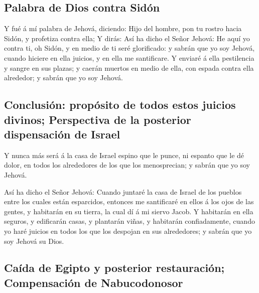 \hypertarget{palabra-de-dios-contra-siduxf3n}{%
\subsection{Palabra de Dios contra
Sidón}\label{palabra-de-dios-contra-siduxf3n}}

 Y fué á mí palabra de Jehová, diciendo: 
Hijo del hombre, pon tu rostro hacia Sidón, y profetiza contra ella;
 Y dirás: Así ha dicho el Señor Jehová: He aquí yo contra
ti, oh Sidón, y en medio de ti seré glorificado: y sabrán que yo soy
Jehová, cuando hiciere en ella juicios, y en ella me santificare.
 Y enviaré á ella pestilencia y sangre en sus plazas; y
caerán muertos en medio de ella, con espada contra ella alrededor; y
sabrán que yo soy Jehová.

\hypertarget{conclusiuxf3n-propuxf3sito-de-todos-estos-juicios-divinos-perspectiva-de-la-posterior-dispensaciuxf3n-de-israel}{%
\subsection{Conclusión: propósito de todos estos juicios divinos;
Perspectiva de la posterior dispensación de
Israel}\label{conclusiuxf3n-propuxf3sito-de-todos-estos-juicios-divinos-perspectiva-de-la-posterior-dispensaciuxf3n-de-israel}}

 Y nunca más será á la casa de Israel espino que le
punce, ni espanto que le dé dolor, en todos los alrededores de los que
los menosprecian; y sabrán que yo soy Jehová.

 Así ha dicho el Señor Jehová: Cuando juntaré la casa de
Israel de los pueblos entre los cuales están esparcidos, entonces me
santificaré en ellos á los ojos de las gentes, y habitarán en su tierra,
la cual dí á mi siervo Jacob.  Y habitarán en ella
seguros, y edificarán casas, y plantarán viñas, y habitarán
confiadamente, cuando yo haré juicios en todos los que los despojan en
sus alrededores; y sabrán que yo soy Jehová su Dios.

\hypertarget{cauxedda-de-egipto-y-posterior-restauraciuxf3n-compensaciuxf3n-de-nabucodonosor}{%
\subsection{Caída de Egipto y posterior restauración; Compensación de
Nabucodonosor}\label{cauxedda-de-egipto-y-posterior-restauraciuxf3n-compensaciuxf3n-de-nabucodonosor}}

